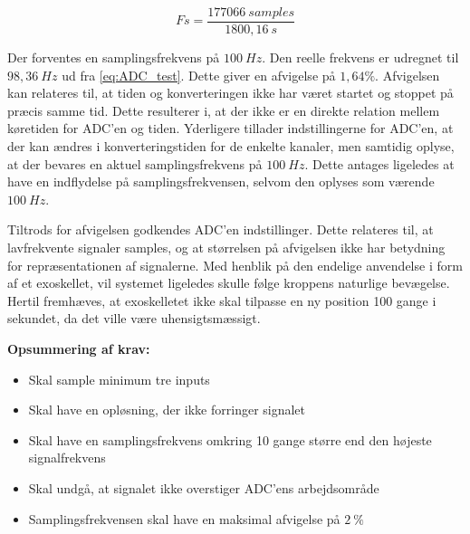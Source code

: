 \begin{equation}\label{eq:ADC_test}
Fs = \frac{177066~samples}{1800,16~s}
\end{equation}

\noindent
Der forventes en samplingsfrekvens på $100~Hz$. Den reelle frekvens er udregnet til $98,36~Hz$ ud fra \autoref{eq:ADC_test}. Dette giver en afvigelse på $1,64\%$. Afvigelsen kan relateres til, at tiden og konverteringen ikke har været startet og stoppet på præcis samme tid. Dette resulterer i, at der ikke er en direkte relation mellem køretiden for ADC'en og tiden. Yderligere tillader indstillingerne for ADC'en, at der kan ændres i konverteringstiden for de enkelte kanaler, men samtidig oplyse, at der bevares en aktuel samplingsfrekvens på $100~Hz$. Dette antages ligeledes at have en indflydelse på samplingsfrekvensen, selvom den oplyses som værende $100~Hz$. 

Tiltrods for afvigelsen godkendes ADC'en indstillinger. Dette relateres til, at lavfrekvente signaler samples, og at størrelsen på afvigelsen ikke har betydning for repræsentationen af signalerne. 
Med henblik på den endelige anvendelse i form af et exoskellet, vil systemet ligeledes skulle følge kroppens naturlige bevægelse. Hertil fremhæves, at exoskelletet ikke skal tilpasse en ny position 100 gange i sekundet, da det ville være uhensigtsmæssigt.


\vspace{3mm}
\textbf{Opsummering af krav:}
\begin{itemize}
\item[\text{\sffamily \checkmark}] Skal sample minimum tre inputs 
\item[\text{\sffamily \checkmark}] Skal have en opløsning, der ikke forringer signalet
\item[\text{\sffamily \checkmark}] Skal have en samplingsfrekvens omkring 10 gange større end den højeste signalfrekvens
\item[\text{\sffamily \checkmark}] Skal undgå, at signalet ikke overstiger ADC'ens arbejdsområde
\item[\text{\sffamily \checkmark}] Samplingsfrekvensen skal have en maksimal afvigelse på $2~\%$
\end{itemize}

